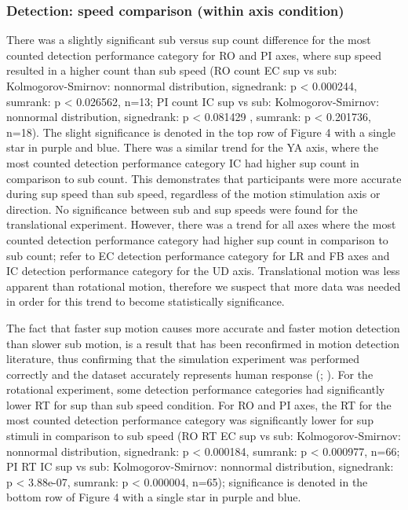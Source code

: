 \documentclass[11pt, onecolumn]{article}
\begin{document}
\subsubsection{Detection: speed comparison (within axis condition)}
There was a slightly significant sub versus sup count difference for the most counted detection performance category for RO and PI axes, where sup speed resulted in a higher count than sub speed (RO count EC sup vs sub: Kolmogorov-Smirnov: nonnormal distribution, signedrank: p < 0.000244, sumrank: p < 0.026562, n=13; PI count IC sup vs sub: Kolmogorov-Smirnov: nonnormal distribution, signedrank: p < 0.081429 , sumrank: p < 0.201736, n=18).  The slight significance is denoted in the top row of Figure 4 with a single star in purple and blue.  There was a similar trend for the YA axis, where the most counted detection performance category IC had higher sup count in comparison to sub count.  This demonstrates that participants were more accurate during sup speed than sub speed, regardless of the motion stimulation axis or direction.  No significance between sub and sup speeds were found for the translational experiment.  However, there was a trend for all axes where the most counted detection performance category had higher sup count in comparison to sub count; refer to EC detection performance category for LR and FB axes and IC detection performance category for the UD axis.  Translational motion was less apparent than rotational motion, therefore we suspect that more data was needed in order for this trend to become statistically significance.

The fact that faster sup motion causes more accurate and faster motion detection than slower sub motion, is a result that has been reconfirmed in motion detection literature, thus confirming that the simulation experiment was performed correctly and the dataset accurately represents human response (\cite{Valko_2012_Vestibular}; \cite{Hartmann_2014_Direction}).  For the rotational experiment, some detection performance categories had significantly lower RT for sup than sub speed condition. For RO and PI axes, the RT for the most counted detection performance category was significantly lower for sup stimuli in comparison to sub speed (RO RT EC sup vs sub: Kolmogorov-Smirnov: nonnormal distribution, signedrank: p < 0.000184, sumrank: p < 0.000977, n=66; PI RT IC  sup vs sub: Kolmogorov-Smirnov: nonnormal distribution, signedrank: p < 3.88e-07, sumrank: p <  0.000004, n=65); significance is denoted in the bottom row of Figure 4 with a single star in purple and blue.
\end{document}
